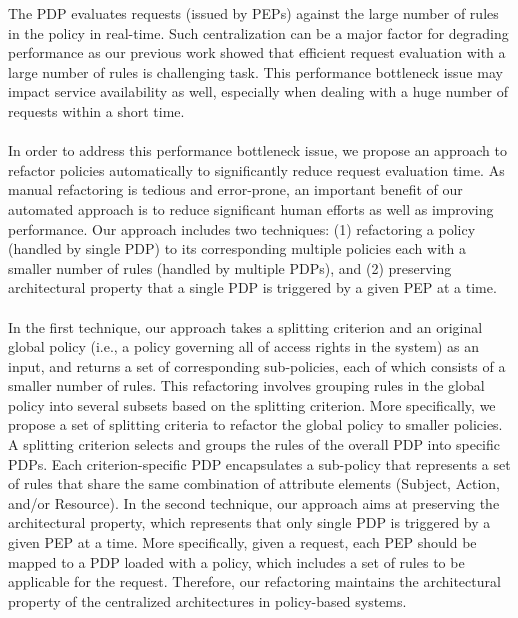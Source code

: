 The PDP evaluates requests (issued by PEPs) against the large number of rules in the policy in real-time. 
Such centralization can be a major factor for degrading performance as our previous work \cite{Xengine} showed that efficient request evaluation with a large number of rules is challenging task. 
This performance bottleneck issue may impact service availability as well, especially when dealing with a huge number of requests within a short time.\\\\
In order to address this performance bottleneck issue, we propose an approach to refactor policies automatically to significantly reduce request evaluation time.
As manual refactoring is tedious and error-prone, an important benefit of our automated approach is to reduce significant human efforts as well as
improving performance.
Our approach includes two techniques: (1) refactoring a policy (handled by single PDP) to its corresponding multiple policies each with a smaller number of rules (handled by multiple PDPs),
and (2) preserving architectural property that a single PDP is triggered by a given PEP at a time.\\\\
In the first technique, our approach takes a splitting criterion and an original global policy (i.e., a policy governing all of access rights in the system) as an input, and returns a set of
corresponding sub-policies, each of which consists of a smaller number of rules.
This refactoring involves grouping rules in the global policy into several subsets based on the splitting criterion.
More specifically, we propose a set of splitting criteria to 
refactor the global policy to smaller policies.
A splitting criterion selects and groups the rules of the overall PDP into specific PDPs.
Each criterion-specific PDP encapsulates a sub-policy that represents a set of rules that share the same combination
of attribute elements (Subject, Action, and/or Resource). In the second technique, our approach aims at preserving the architectural property, which represents that only single PDP is triggered by a given PEP at a time. 
More specifically, given a request, each PEP should be mapped to a PDP loaded with a policy, 
which includes a set of rules to be applicable for the request.
Therefore, our refactoring maintains the architectural property of the centralized architectures in policy-based systems.\\\\



